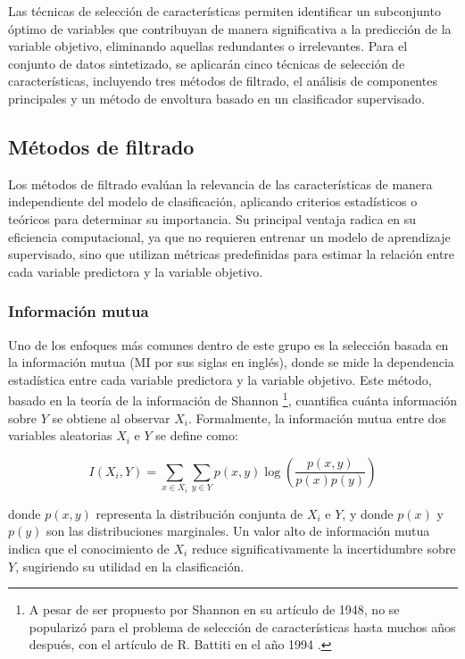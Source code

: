 \documentclass[a4paper,12pt]{article}
\begin{document}
Las técnicas de selección de características permiten identificar un subconjunto óptimo de variables que contribuyan de manera significativa a la predicción de la variable objetivo, eliminando aquellas redundantes o irrelevantes. Para el conjunto de datos sintetizado, se aplicarán cinco técnicas de selección de características, incluyendo tres métodos de filtrado, el análisis de componentes principales y un método de envoltura basado en un clasificador supervisado.

\subsection{Métodos de filtrado}

Los métodos de filtrado evalúan la relevancia de las características de manera independiente del modelo de clasificación, aplicando criterios estadísticos o teóricos para determinar su importancia. Su principal ventaja radica en su eficiencia computacional, ya que no requieren entrenar un modelo de aprendizaje supervisado, sino que utilizan métricas predefinidas para estimar la relación entre cada variable predictora y la variable objetivo.

\subsubsection{Información mutua}

Uno de los enfoques más comunes dentro de este grupo es la selección basada en la información mutua (MI por sus siglas en inglés), donde se mide la dependencia estadística entre cada variable predictora y la variable objetivo. Este método, basado en la teoría de la información de Shannon \cite{shannon1948}\footnote{A pesar de ser propuesto por Shannon en su artículo de 1948, no se popularizó para el problema de selección de características hasta muchos años después, con el artículo de R. Battiti en el año 1994 \cite{battiti1994}.}, cuantifica cuánta información sobre \( Y \) se obtiene al observar \( X_i \). Formalmente, la información mutua entre dos variables aleatorias \( X_i \) e \( Y \) se define como:

\[
    I(X_i, Y) = \sum_{x \in X_i} \sum_{y \in Y} p(x,y) \log \left( \frac{p(x,y)}{p(x)p(y)} \right)
\]

\noindent donde \( p(x,y) \) representa la distribución conjunta de \( X_i \) e \( Y \), y donde \( p(x) \) y \( p(y) \) son las distribuciones marginales. Un valor alto de información mutua indica que el conocimiento de \( X_i \) reduce significativamente la incertidumbre sobre \( Y \), sugiriendo su utilidad en la clasificación.
\end{document}
